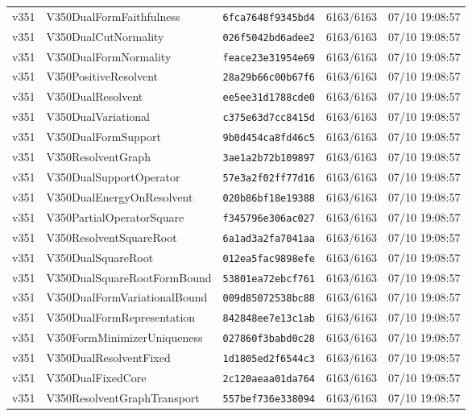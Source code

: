 \documentclass[11pt]{article}
\theoremstyle{definition}\newtheorem{deriv}{Derivação}
\begin{document}
{\begin{longtable}{@{}lllll@{}}
v351 & V350DualFormFaithfulness & \texttt{6fca7648f9345bd4} & 6163/6163 & 07/10 19:08:57 \\
v351 & V350DualCutNormality & \texttt{026f5042bd6adee2} & 6163/6163 & 07/10 19:08:57 \\
v351 & V350DualFormNormality & \texttt{feace23e31954e69} & 6163/6163 & 07/10 19:08:57 \\
v351 & V350PositiveResolvent & \texttt{28a29b66c00b67f6} & 6163/6163 & 07/10 19:08:57 \\
v351 & V350DualResolvent & \texttt{ee5ee31d1788cde0} & 6163/6163 & 07/10 19:08:57 \\
v351 & V350DualVariational & \texttt{c375e63d7cc8415d} & 6163/6163 & 07/10 19:08:57 \\
v351 & V350DualFormSupport & \texttt{9b0d454ca8fd46c5} & 6163/6163 & 07/10 19:08:57 \\
v351 & V350ResolventGraph & \texttt{3ae1a2b72b109897} & 6163/6163 & 07/10 19:08:57 \\
v351 & V350DualSupportOperator & \texttt{57e3a2f02ff77d16} & 6163/6163 & 07/10 19:08:57 \\
v351 & V350DualEnergyOnResolvent & \texttt{020b86bf18e19388} & 6163/6163 & 07/10 19:08:57 \\
v351 & V350PartialOperatorSquare & \texttt{f345796e306ac027} & 6163/6163 & 07/10 19:08:57 \\
v351 & V350ResolventSquareRoot & \texttt{6a1ad3a2fa7041aa} & 6163/6163 & 07/10 19:08:57 \\
v351 & V350DualSquareRoot & \texttt{012ea5fac9898efe} & 6163/6163 & 07/10 19:08:57 \\
v351 & V350DualSquareRootFormBound & \texttt{53801ea72ebcf761} & 6163/6163 & 07/10 19:08:57 \\
v351 & V350DualFormVariationalBound & \texttt{009d85072538bc88} & 6163/6163 & 07/10 19:08:57 \\
v351 & V350DualFormRepresentation & \texttt{842848ee7e13c1ab} & 6163/6163 & 07/10 19:08:57 \\
v351 & V350FormMinimizerUniqueness & \texttt{027860f3babd0c28} & 6163/6163 & 07/10 19:08:57 \\
v351 & V350DualResolventFixed & \texttt{1d1805ed2f6544c3} & 6163/6163 & 07/10 19:08:57 \\
v351 & V350DualFixedCore & \texttt{2c120aeaa01da764} & 6163/6163 & 07/10 19:08:57 \\
v351 & V350ResolventGraphTransport & \texttt{557bef736e338094} & 6163/6163 & 07/10 19:08:57 \\

\end{longtable}}
\end{document}
